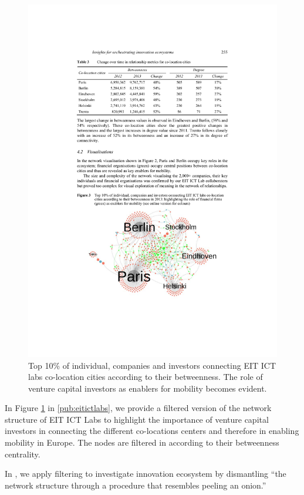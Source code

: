 \begin{figure}[htb]
\centering
\includegraphics[width=12cm]{figure/eitictlabs-top10percent.pdf}
\caption{Top 10\% of individual, companies and investors connecting EIT ICT labs co-location cities according to their betweenness. The role of venture capital investors as enablers for mobility becomes evident.}
\label{fig:eitictlabs-top10percent}
\end{figure}

In Figure \ref{fig:eitictlabs-top10percent} in \ref{pub:eitictlabs}, we provide a filtered version of the network structure of EIT ICT Labs to highlight the importance of venture capital investors in connecting the different co-locations centers and therefore in enabling mobility in Europe. The nodes are filtered in according to their betweenness centrality. 

In \cite{Jarvi2016DismantlingLinkages}, we apply filtering to investigate innovation ecosystem by dismantling ``the network structure through a procedure that resembles peeling an onion.'' 

